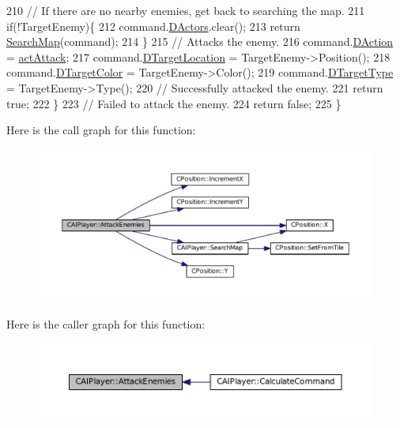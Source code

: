 \begin{DoxyCode}
210         \textcolor{comment}{// If there are no nearby enemies, get back to searching the map.}
211         \textcolor{keywordflow}{if}(!TargetEnemy)\{
212             command.\hyperlink{structSPlayerCommandRequest_aa37fc01519676345703d78b9f573894a}{DActors}.clear();
213             \textcolor{keywordflow}{return} \hyperlink{classCAIPlayer_afafbe8fc589e09a16ae1f02f2794d7b0}{SearchMap}(command);
214         \}
215         \textcolor{comment}{// Attacks the enemy.}
216         command.\hyperlink{structSPlayerCommandRequest_a80897bbccf2c4e0b148a7aa815a926c6}{DAction} = \hyperlink{GameDataTypes_8h_a35b98ce26aca678b03c6f9f76e4778ceaf90bc0c36c70d816217d0d4b08b0ba4c}{actAttack};
217         command.\hyperlink{structSPlayerCommandRequest_a701702b94ca2fd2738e95ef6711dd41a}{DTargetLocation} = TargetEnemy->Position();
218         command.\hyperlink{structSPlayerCommandRequest_a3690a5117efe6214d92f18d672b5714f}{DTargetColor} = TargetEnemy->Color();
219         command.\hyperlink{structSPlayerCommandRequest_a864e47c641127665751091876a6d3c5e}{DTargetType} = TargetEnemy->Type(); 
220         \textcolor{comment}{// Successfully attacked the enemy.}
221         \textcolor{keywordflow}{return} \textcolor{keyword}{true};
222     \}
223     \textcolor{comment}{// Failed to attack the enemy.}
224     \textcolor{keywordflow}{return} \textcolor{keyword}{false};    
225 \}
\end{DoxyCode}
Here is the call graph for this function\+:\nopagebreak
\begin{figure}[H]
\begin{center}
\leavevmode
\includegraphics[width=350pt]{classCAIPlayer_adf7feeba7debf9f19b000887616d7bfb_cgraph}
\end{center}
\end{figure}
Here is the caller graph for this function\+:\nopagebreak
\begin{figure}[H]
\begin{center}
\leavevmode
\includegraphics[width=350pt]{classCAIPlayer_adf7feeba7debf9f19b000887616d7bfb_icgraph}
\end{center}
\end{figure}
\hypertarget{classCAIPlayer_a2ff5263cbaa6bfc62ffec4dbce87ba88}{}\label{classCAIPlayer_a2ff5263cbaa6bfc62ffec4dbce87ba88} 
